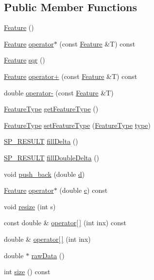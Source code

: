 \subsection*{Public Member Functions}
\begin{DoxyCompactItemize}
\item 
\hyperlink{class_feature_a06d191f6daea88e0029440a2137f2e07}{Feature} ()
\item 
\hyperlink{class_feature}{Feature} \hyperlink{class_feature_a90f1fbc54bfae85f7edf8234ffbfd29c}{operator$\ast$} (const \hyperlink{class_feature}{Feature} \&T) const 
\item 
\hyperlink{class_feature}{Feature} \hyperlink{class_feature_a7e9d7aa483a2252b914db28edf0c981f}{sqr} ()
\item 
\hyperlink{class_feature}{Feature} \hyperlink{class_feature_a733baf36f22566c35aca39fd29236e0f}{operator+} (const \hyperlink{class_feature}{Feature} \&T) const 
\item 
double \hyperlink{class_feature_a9c94cc178ad282294fa94a795eb0d401}{operator-\/} (const \hyperlink{class_feature}{Feature} \&T)
\item 
\hyperlink{class_feature_afa43293b1c8369e9ff47f6eedb7ad264}{Feature\+Type} \hyperlink{class_feature_a267870d668dfb6c245b00633af6bcb93}{get\+Feature\+Type} ()
\item 
\hyperlink{class_feature_afa43293b1c8369e9ff47f6eedb7ad264}{Feature\+Type} \hyperlink{class_feature_a4ae182413e415b449023c933c9b7f04d}{set\+Feature\+Type} (\hyperlink{class_feature_afa43293b1c8369e9ff47f6eedb7ad264}{Feature\+Type} \hyperlink{class_feature_a9325ce63b0c3062d70ad02a0e51e4ed3}{type})
\item 
\hyperlink{tool_8h_ab71a1f2fb85a32402ced5c483105b38e}{S\+P\+\_\+\+R\+E\+S\+U\+L\+T} \hyperlink{class_feature_a6eb221814384244f007201c41c95f372}{fill\+Delta} ()
\item 
\hyperlink{tool_8h_ab71a1f2fb85a32402ced5c483105b38e}{S\+P\+\_\+\+R\+E\+S\+U\+L\+T} \hyperlink{class_feature_a301410df571143da9c1a584246925122}{fill\+Double\+Delta} ()
\item 
void \hyperlink{class_feature_ab8e0691828f51eddd940bb37c90d7d4f}{push\+\_\+back} (double \hyperlink{deltas_8m_ace9cdca9c1b355d9b321fd7f5ec2026b}{d})
\item 
\hyperlink{class_feature}{Feature} \hyperlink{class_feature_a297dc1375d2e371f1c0ec2cf01d6b9b7}{operator$\ast$} (double \hyperlink{lpc2spec_8m_aa49cfdd4fa4d74d71f78a001a1b635d0}{c}) const 
\item 
void \hyperlink{class_feature_a5f2a277917e11f2b7ae6a3f8a63269b8}{resize} (int s)
\item 
const double \& \hyperlink{class_feature_acd67423c3e4b1ea3ddbd257a5614b728}{operator\mbox{[}$\,$\mbox{]}} (int inx) const 
\item 
double \& \hyperlink{class_feature_abb9d8d94d76d810ff1e27c520635c3d5}{operator\mbox{[}$\,$\mbox{]}} (int inx)
\item 
double $\ast$ \hyperlink{class_feature_aae18201782746fa7c307a23f04bf81e7}{raw\+Data} ()
\item 
int \hyperlink{class_feature_a642422dbea17738eca73be4467a683ea}{size} () const 
\end{DoxyCompactItemize}
